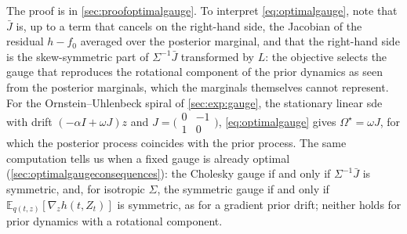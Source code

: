 \documentclass{article} %
\newcommand{\priordrift}{h}
\newcommand{\postdrift}{f}
\newcommand{\gauge}{\Omega}
\newcommand{\E}{\mathbb{E}}
\begin{document}
The proof is in \cref{sec:proofoptimalgauge}. To interpret \cref{eq:optimalgauge}, note that $\bar J$ is, up to a term that cancels on the right-hand side, the Jacobian of the residual $\priordrift - \postdrift_0$ averaged over the posterior marginal, and that the right-hand side is the skew-symmetric part of $\Sigma^{-1} \bar J$ transformed by $L$: the objective selects the gauge that reproduces the rotational component of the prior dynamics as seen from the posterior marginals, which the marginals themselves cannot represent. For the Ornstein--Uhlenbeck spiral of \cref{sec:exp:gauge}, the stationary linear \gls{sde} with drift $(-\alpha I + \omega J) z$ and $J = \bigl(\begin{smallmatrix} 0 & -1 \\ 1 & 0 \end{smallmatrix}\bigr)$, \cref{eq:optimalgauge} gives $\gauge^\star = \omega J$, for which the posterior process coincides with the prior process. The same computation tells us when a fixed gauge is already optimal (\cref{sec:optimalgaugeconsequences}): the Cholesky gauge if and only if $\Sigma^{-1} \bar J$ is symmetric, and, for isotropic $\Sigma$, the symmetric gauge if and only if $\E_{q(t, z)}[\nabla_z \priordrift(t, Z_t)]$ is symmetric, as for a gradient prior drift; neither holds for prior dynamics with a rotational component.
\end{document}
